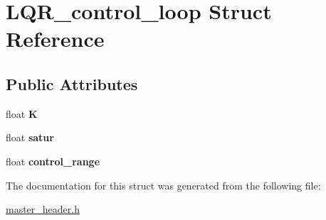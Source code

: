 \hypertarget{structLQR__control__loop}{\section{L\-Q\-R\-\_\-control\-\_\-loop Struct Reference}
\label{structLQR__control__loop}
}
\subsection*{Public Attributes}
\begin{DoxyCompactItemize}
\item 
\hypertarget{structLQR__control__loop_a2931b4d0886bd656eb4e0cc05d09e061}{float {\bfseries K}}\label{structLQR__control__loop_a2931b4d0886bd656eb4e0cc05d09e061}

\item 
\hypertarget{structLQR__control__loop_a92243d19c31accb79b0f3496ed8d099d}{float {\bfseries satur}}\label{structLQR__control__loop_a92243d19c31accb79b0f3496ed8d099d}

\item 
\hypertarget{structLQR__control__loop_a9bac9e16e10445cbce605332be22ae99}{float {\bfseries control\-\_\-range}}\label{structLQR__control__loop_a9bac9e16e10445cbce605332be22ae99}

\end{DoxyCompactItemize}


The documentation for this struct was generated from the following file\-:\begin{DoxyCompactItemize}
\item 
\hyperlink{master__header_8h}{master\-\_\-header.\-h}\end{DoxyCompactItemize}
